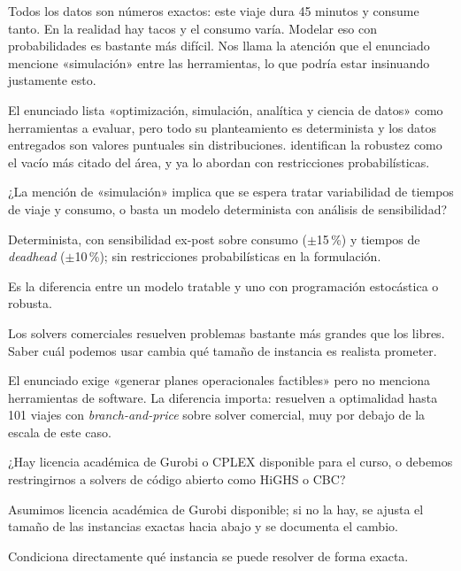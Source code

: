 \documentclass[11pt,a4paper,parskip=half]{scrartcl}
\begin{document}
\begin{campos}
\item[En simple] Todos los datos son números exactos: este viaje dura 45 minutos y consume tanto. En la realidad hay tacos y el consumo varía. Modelar eso con probabilidades es bastante más difícil. Nos llama la atención que el enunciado mencione «simulación» entre las herramientas, lo que podría estar insinuando justamente esto.
\item[Evidencia] El enunciado lista «optimización, simulación, analítica y ciencia de datos» como herramientas a evaluar, pero todo su planteamiento es determinista y los datos entregados son valores puntuales sin distribuciones. \citet{perumal_evspreview_2022} identifican la robustez como el vacío más citado del área, y \citet{ricard_chanceconstrained_2026} ya lo abordan con restricciones probabilísticas.
\item[Pregunta] ¿La mención de «simulación» implica que se espera tratar variabilidad de tiempos de viaje y consumo, o basta un modelo determinista con análisis de sensibilidad?
\item[Supuesto] Determinista, con sensibilidad ex-post sobre consumo ($\pm$15\,\%) y tiempos de \textit{deadhead} ($\pm$10\,\%); sin restricciones probabilísticas en la formulación.
\item[Impacto] Es la diferencia entre un modelo tratable y uno con programación estocástica o robusta.
\end{campos}

\begin{campos}
\item[En simple] Los solvers comerciales resuelven problemas bastante más grandes que los libres. Saber cuál podemos usar cambia qué tamaño de instancia es realista prometer.
\item[Evidencia] El enunciado exige «generar planes operacionales factibles» pero no menciona herramientas de software. La diferencia importa: \citet{wu_waitingtimebranchprice_2025} resuelven a optimalidad hasta 101 viajes con \textit{branch-and-price} sobre solver comercial, muy por debajo de la escala de este caso.
\item[Pregunta] ¿Hay licencia académica de Gurobi o CPLEX disponible para el curso, o debemos restringirnos a solvers de código abierto como HiGHS o CBC?
\item[Supuesto] Asumimos licencia académica de Gurobi disponible; si no la hay, se ajusta el tamaño de las instancias exactas hacia abajo y se documenta el cambio.
\item[Impacto] Condiciona directamente qué instancia se puede resolver de forma exacta.
\end{campos}
\end{document}
